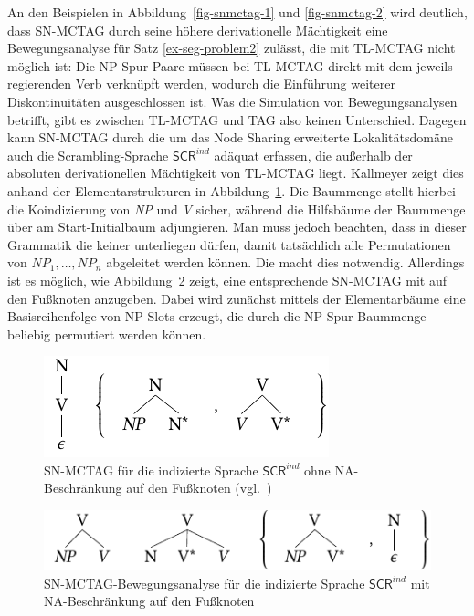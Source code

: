 An den Beispielen in Abbildung~\ref{fig-snmctag-1} und \ref{fig-snmctag-2} wird deutlich, dass SN-MCTAG durch seine höhere derivationelle Mächtigkeit eine Bewegungsanalyse für Satz \ref{ex-seg-problem2} zulässt, die mit TL-MCTAG nicht möglich ist: Die NP-Spur-Paare müssen bei TL-MCTAG direkt mit dem jeweils regierenden Verb verknüpft werden, wodurch die Einführung weiterer Diskontinuitäten ausgeschlossen ist. Was die Simulation von Bewegungsanalysen betrifft, gibt es zwischen TL-MCTAG und TAG also keinen Unterschied. Dagegen kann SN-MCTAG durch die um das Node Sharing erweiterte Lokalitätsdomäne auch die Scrambling-Sprache $\mathsf{SCR}^{ind}$ adäquat erfassen, die au\ss erhalb der absoluten derivationellen Mächtigkeit von TL-MCTAG liegt. Kallmeyer zeigt dies anhand der Elementarstrukturen in Abbildung~\ref{fig-snmctag-3}. Die Baummenge stellt hierbei die Koindizierung von \textit{NP} und \textit{V} sicher, während die Hilfsbäume der Baummenge über  am Start-Initialbaum adjungieren. Man muss jedoch beachten, dass in dieser Grammatik die  keiner  unterliegen dürfen, damit tatsächlich alle Permutationen von $\mathit{NP}_1, \ldots, \mathit{NP}_n$ abgeleitet werden können. Die  macht dies notwendig. Allerdings ist es möglich, wie Abbildung~\ref{fig-snmctag-4} zeigt, eine entsprechende SN-MCTAG mit  auf den Fu\ss knoten anzugeben. Dabei wird zunächst mittels der Elementarbäume eine Basisreihenfolge von NP-Slots erzeugt, die durch die NP-Spur-Baummenge beliebig permutiert werden können. 

\begin{figure}[t]
\centering
\includegraphics{graphics/abb617.pdf}
\caption{SN-MCTAG für die indizierte Sprache $\mathsf{SCR}^{ind}$ ohne NA-Beschränkung auf den Fu\ss knoten (vgl.\ \citealt[Figure~5]{Kallmeyer:05})\label{fig-snmctag-3}} 
\end{figure}

\begin{figure}[t]
\centering
\includegraphics{graphics/abb618.pdf}
\caption{SN-MCTAG-Bewegungsanalyse für die indizierte Sprache $\mathsf{SCR}^{ind}$  mit NA-Beschränkung auf den Fu\ss knoten\label{fig-snmctag-4}}
\end{figure}


